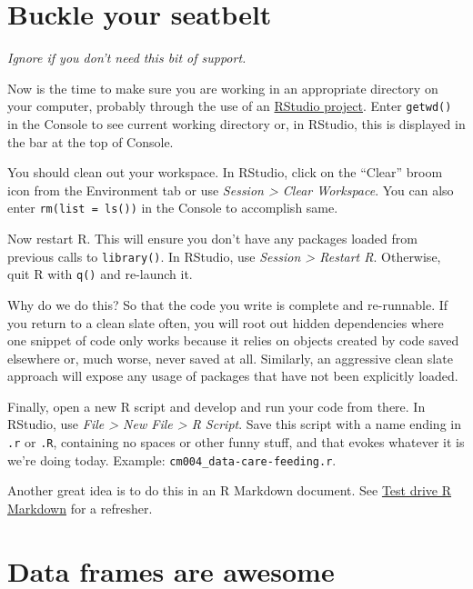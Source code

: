 \documentclass[
]{book}
\begin{document}
\hypertarget{buckle-your-seatbelt}{%
\section{Buckle your seatbelt}\label{buckle-your-seatbelt}}

\emph{Ignore if you don't need this bit of support.}

Now is the time to make sure you are working in an appropriate directory on your computer, probably through the use of an \protect\hyperlink{rprojs}{RStudio project}. Enter \texttt{getwd()} in the Console to see current working directory or, in RStudio, this is displayed in the bar at the top of Console.

You should clean out your workspace. In RStudio, click on the ``Clear'' broom icon from the Environment tab or use \emph{Session \textgreater{} Clear Workspace}. You can also enter \texttt{rm(list\ =\ ls())} in the Console to accomplish same.

Now restart R. This will ensure you don't have any packages loaded from previous calls to \texttt{library()}. In RStudio, use \emph{Session \textgreater{} Restart R}. Otherwise, quit R with \texttt{q()} and re-launch it.

Why do we do this? So that the code you write is complete and re-runnable. If you return to a clean slate often, you will root out hidden dependencies where one snippet of code only works because it relies on objects created by code saved elsewhere or, much worse, never saved at all. Similarly, an aggressive clean slate approach will expose any usage of packages that have not been explicitly loaded.

Finally, open a new R script and develop and run your code from there. In RStudio, use \emph{File \textgreater{} New File \textgreater{} R Script}. Save this script with a name ending in \texttt{.r} or \texttt{.R}, containing no spaces or other funny stuff, and that evokes whatever it is we're doing today. Example: \texttt{cm004\_data-care-feeding.r}.

Another great idea is to do this in an R Markdown document. See \protect\hyperlink{r-markdown}{Test drive R Markdown} for a refresher.

\hypertarget{data-frames-are-awesome}{%
\section{Data frames are awesome}\label{data-frames-are-awesome}}
\end{document}
